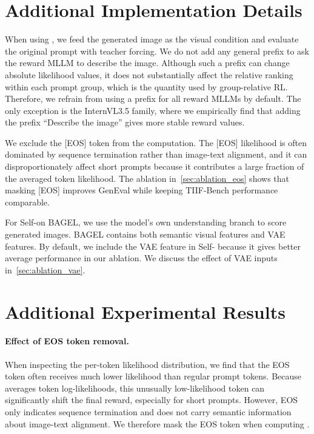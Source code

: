 \section{Additional Implementation Details}
\label{sec:additional_implementation_details}
When using \method, we feed the generated image as the visual condition
and evaluate the original prompt with teacher forcing. We do not add any
general prefix to ask the reward MLLM to describe the image. Although
such a prefix can change absolute likelihood values, it does not
substantially affect the relative ranking within each prompt group, which
is the quantity used by group-relative RL. Therefore, we refrain from
using a prefix for all reward MLLMs by default. The only exception is the
InternVL3.5 family, where we empirically find that adding the prefix
``Describe the image'' gives more stable reward values.

We exclude the [EOS] token from the \method computation. The [EOS]
likelihood is often dominated by sequence termination rather than
image-text alignment, and it can disproportionately affect short prompts
because it contributes a large fraction of the averaged token likelihood.
The ablation in~\autoref{sec:ablation_eos} shows that masking [EOS]
improves GenEval while keeping TIIF-Bench performance comparable.

For Self-\method on BAGEL, we use the model's own understanding branch to
score generated images. BAGEL contains both semantic visual features and
VAE features. By default, we include the VAE feature in Self-\method
because it gives better average performance in our ablation. We discuss
the effect of VAE inputs in~\autoref{sec:ablation_vae}.

\section{Additional Experimental Results}
\label{sec:additional_experimental_results}

\paragraph{Effect of EOS token removal.}
\label{sec:ablation_eos}
When inspecting the per-token likelihood distribution, 
we find that the EOS token often receives much lower likelihood than regular prompt tokens. 
Because \method averages token log-likelihoods, this unusually low-likelihood token can significantly shift the final reward, especially for short prompts. 
However, EOS only indicates sequence termination and does not carry semantic information about image-text alignment. 
We therefore mask the EOS token when computing \method.

